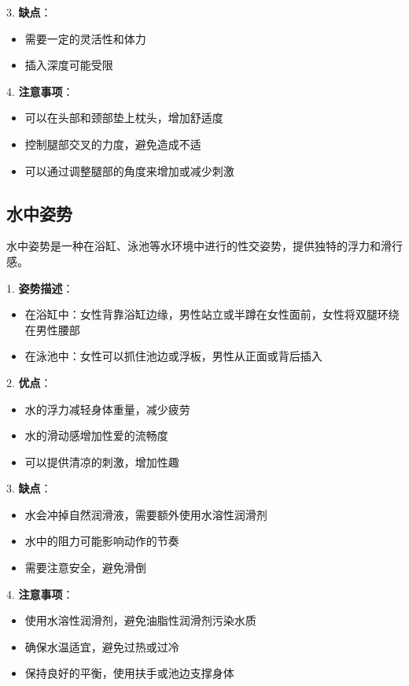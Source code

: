 \documentclass[12pt,UTF8]{ctexbook}
\begin{document}
3. \textbf{缺点}：
  \begin{itemize}
  \item 需要一定的灵活性和体力
  \item 插入深度可能受限
  \end{itemize}

4. \textbf{注意事项}：
  \begin{itemize}
  \item 可以在头部和颈部垫上枕头，增加舒适度
  \item 控制腿部交叉的力度，避免造成不适
  \item 可以通过调整腿部的角度来增加或减少刺激
  \end{itemize}

\subsection{水中姿势}

水中姿势是一种在浴缸、泳池等水环境中进行的性交姿势，提供独特的浮力和滑行感。

1. \textbf{姿势描述}：
  \begin{itemize}
  \item 在浴缸中：女性背靠浴缸边缘，男性站立或半蹲在女性面前，女性将双腿环绕在男性腰部
  \item 在泳池中：女性可以抓住池边或浮板，男性从正面或背后插入
  \end{itemize}

2. \textbf{优点}：
  \begin{itemize}
  \item 水的浮力减轻身体重量，减少疲劳
  \item 水的滑动感增加性爱的流畅度
  \item 可以提供清凉的刺激，增加性趣
  \end{itemize}

3. \textbf{缺点}：
  \begin{itemize}
  \item 水会冲掉自然润滑液，需要额外使用水溶性润滑剂
  \item 水中的阻力可能影响动作的节奏
  \item 需要注意安全，避免滑倒
  \end{itemize}

4. \textbf{注意事项}：
  \begin{itemize}
  \item 使用水溶性润滑剂，避免油脂性润滑剂污染水质
  \item 确保水温适宜，避免过热或过冷
  \item 保持良好的平衡，使用扶手或池边支撑身体
  \end{itemize}
\end{document}

